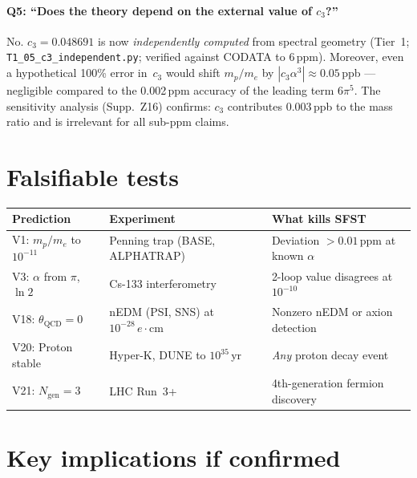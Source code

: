 \documentclass[11pt,a4paper]{article}
\begin{document}
\paragraph{Q5: ``Does the theory depend on the external value of $c_3$?''}
No.  $c_3=0.048691$ is now \emph{independently computed} from spectral
geometry (Tier~1; \texttt{T1\_05\_c3\_independent.py}; verified against
CODATA to 6\,ppm).  Moreover, even a hypothetical 100\% error in~$c_3$
would shift $m_p/m_e$ by $|c_3\alpha^3|\approx 0.05\,$ppb --- negligible
compared to the 0.002\,ppm accuracy of the leading term $6\pi^5$.  The
sensitivity analysis (Supp.~Z16) confirms: $c_3$ contributes 0.003\,ppb
to the mass ratio and is irrelevant for all sub-ppm claims.

\section*{Falsifiable tests}

\begin{center}
\renewcommand{\arraystretch}{1.15}\small
\begin{tabular}{lp{4cm}p{4.5cm}}
\toprule
\textbf{Prediction} & \textbf{Experiment} & \textbf{What kills SFST}\\
\midrule
V1: $m_p/m_e$ to $10^{-11}$
  & Penning trap (BASE, ALPHATRAP)
  & Deviation $>0.01\,$ppm at known $\alpha$\\
V3: $\alpha$ from $\pi$, $\ln 2$
  & Cs-133 interferometry
  & 2-loop value disagrees at $10^{-10}$\\
V18: $\theta_{\mathrm{QCD}}=0$
  & nEDM (PSI, SNS) at $10^{-28}\,e\!\cdot\!\mathrm{cm}$
  & Nonzero nEDM or axion detection\\
V20: Proton stable
  & Hyper-K, DUNE to $10^{35}\,$yr
  & \emph{Any} proton decay event\\
V21: $N_{\mathrm{gen}}=3$
  & LHC Run~3+
  & 4th-generation fermion discovery\\
\bottomrule
\end{tabular}
\end{center}

\section*{Key implications if confirmed}
\end{document}
